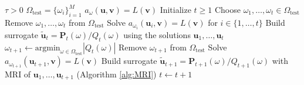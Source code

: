 \begin{algorithmic}
    \Require $\tau > 0$ 
    \Require $\Omega_{\mathrm{test}} = \{\omega_i\}_{i=1}^M$ 
    \Require $a_{\omega}(\mathbf{u}, \mathbf{v}) = L(\mathbf{v})$ 
    \State Initialize $t \geq 1$
    \State Choose $\omega_1, \dots, \omega_t \in \Omega_{\mathrm{test}}$ 
    \State Remove $\omega_1, \dots, \omega_t$ from $\Omega_{\mathrm{test}}$
    \State Solve $a_{\omega_i}(\mathbf{u}_i, \mathbf{v}) = L(\mathbf{v})$ for $i \in \{1, \dots, t\}$
    \State Build surrogate $\mathbf{\tilde{u}}_t = \mathbf{P}_t(\omega) / Q_t(\omega)$ using the solutions $\mathbf{u}_1, \dots, \mathbf{u}_t$
        \State $\omega_{t+1} \leftarrow \textrm{argmin}_{\omega \in \Omega_{\mathrm{test}}} |Q_t(\omega)|$
        \State Remove $\omega_{t+1}$ from $\Omega_{\mathrm{test}}$
        \State Solve $a_{\omega_{t+1}}(\mathbf{u}_{t+1}, \mathbf{v}) = L(\mathbf{v})$
        \State Build surrogate $\mathbf{\tilde{u}}_{t+1} = \mathbf{P}_{t+1}(\omega) / Q_{t+1}(\omega)$ with \acrshort{MRI} of $\mathbf{u}_1, \dots, \mathbf{u}_{t+1}$ (Algorithm \ref{alg:MRI})
            \Return
        \EndIf
        \State $t \leftarrow t+1$
    \EndWhile
\end{algorithmic}